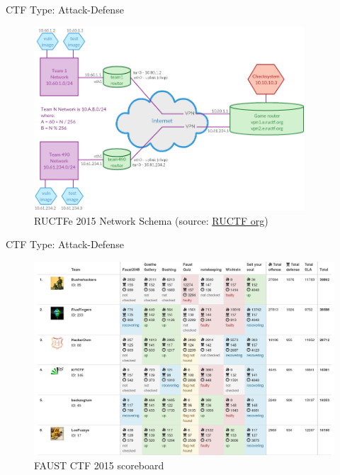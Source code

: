 \begin{frame}
  {CTF Type: Attack-Defense}

  \begin{figure}[h]
    \centering
    \includegraphics[width=0.9\textwidth]{../images/ructf-network.png}
    \caption{\footnotesize
      RUCTFe 2015 Network Schema (source:
      \href{https://ructf.org/e/2015/network.html}{RUCTF org}) }
  \end{figure}
\end{frame}

\begin{frame}
  {CTF Type: Attack-Defense}

  \begin{figure}[h]
    \centering
    \includegraphics[width=\textwidth]{../images/faustctf-scoreboard.png}
    \caption{\footnotesize{}FAUST CTF 2015 scoreboard}
    \label{fig:faustctfscoreboard}
  \end{figure}

\end{frame}


